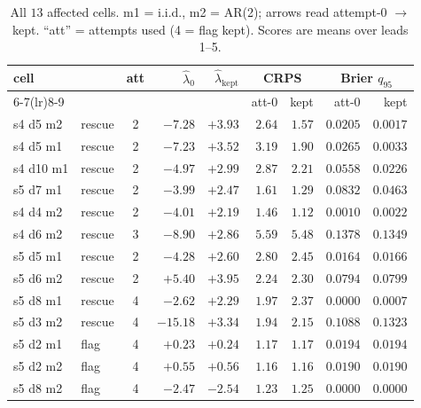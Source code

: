 \documentclass[11pt]{article}
\begin{document}
\begin{table}[ht]
\centering
\caption{All $13$ affected cells. m1 = i.i.d., m2 = AR(2); arrows read
attempt-0 $\to$ kept. ``att'' = attempts used (4 = flag kept). Scores are
means over leads 1--5.}
\label{tab:cases}
\small
\begin{tabular}{llcrrrrrr}
\toprule
cell & & att & $\hat\lambda_0$ & $\hat\lambda_{\text{kept}}$ &
\multicolumn{2}{c}{CRPS} & \multicolumn{2}{c}{Brier $q_{95}$} \\
\cmidrule(lr){6-7}\cmidrule(lr){8-9}
 & & & & & att-0 & kept & att-0 & kept \\
\midrule
s4 d5  m2 & rescue & 2 & $-7.28$ & $+3.93$ & $2.64$ & $1.57$ & $0.0205$ & $\mathbf{0.0017}$ \\
s4 d5  m1 & rescue & 2 & $-7.23$ & $+3.52$ & $3.19$ & $1.90$ & $0.0265$ & $\mathbf{0.0033}$ \\
s4 d10 m1 & rescue & 2 & $-4.97$ & $+2.99$ & $2.87$ & $2.21$ & $0.0558$ & $0.0226$ \\
s5 d7  m1 & rescue & 2 & $-3.99$ & $+2.47$ & $1.61$ & $1.29$ & $0.0832$ & $0.0463$ \\
s4 d4  m2 & rescue & 2 & $-4.01$ & $+2.19$ & $1.46$ & $1.12$ & $0.0010$ & $0.0022$ \\
s4 d6  m2 & rescue & 3 & $-8.90$ & $+2.86$ & $5.59$ & $5.48$ & $0.1378$ & $0.1349$ \\
s5 d5  m1 & rescue & 2 & $-4.28$ & $+2.60$ & $2.80$ & $2.45$ & $0.0164$ & $0.0166$ \\
s5 d6  m2 & rescue & 2 & $+5.40$ & $+3.95$ & $2.24$ & $2.30$ & $0.0794$ & $0.0799$ \\
s5 d8  m1 & rescue & 4 & $-2.62$ & $+2.29$ & $1.97$ & $2.37$ & $0.0000$ & $0.0007$ \\
s5 d3  m2 & rescue & 4 & $\mathbf{-15.18}$ & $+3.34$ & $1.94$ & $\mathbf{2.15}$ & $0.1088$ & $\mathbf{0.1323}$ \\
\midrule
s5 d2  m1 & flag & 4 & $+0.23$ & $+0.24$ & $1.17$ & $1.17$ & $0.0194$ & $0.0194$ \\
s5 d2  m2 & flag & 4 & $+0.55$ & $+0.56$ & $1.16$ & $1.16$ & $0.0190$ & $0.0190$ \\
s5 d8  m2 & flag & 4 & $-2.47$ & $-2.54$ & $1.23$ & $1.25$ & $0.0000$ & $0.0000$ \\
\bottomrule
\end{tabular}
\end{table}
\end{document}
